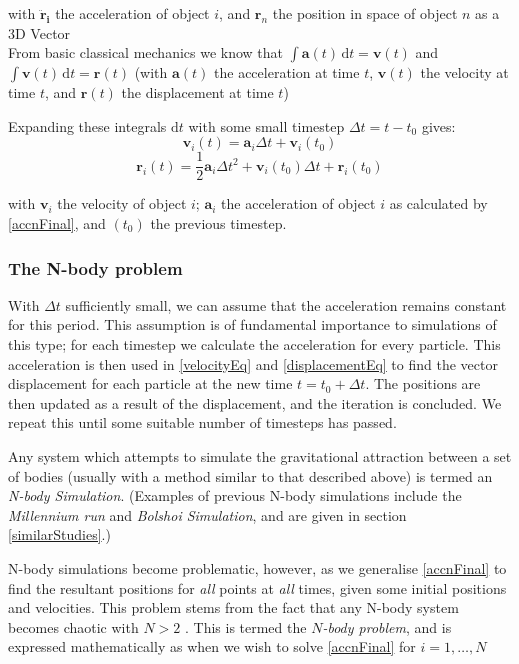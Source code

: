 \documentclass[11pt,a4paper]{article}
\begin{document}
\noindent with $\mathbf {\ddot r_{i}}$ the acceleration of object $i$, and $\mathbf r_{n}$ the position in space of object $n$ as a 3D Vector
\\[0.3cm]
\noindent From basic classical mechanics we know that
$\int \! \mathbf a(t) \, \mathrm{d}t = \mathbf v(t)$ and 
$\int \! \mathbf v(t) \, \mathrm{d}t = \mathbf r(t)$
\noindent (with $\mathbf a(t)$ the acceleration at time $t$, $\mathbf v(t)$ the velocity at time $t$, and $\mathbf r(t)$ the displacement at time $t$)

\noindent Expanding these integrals $\mathrm{d}t$ with some small timestep $\Delta t=t-t_0$ gives:
\begin{equation}
\mathbf v_i(t) = \mathbf a_i \Delta t + \mathbf v_i(t_0)
\label{velocityEq}
\end{equation}
\begin{equation}
\mathbf r_i(t)=\frac{1}{2}\mathbf a_i\Delta t^2 + \mathbf v_i(t_0)\Delta t + \mathbf r_i(t_0)
\label{displacementEq}
\end{equation}

\noindent with $\mathbf v_i$ the velocity of object $i$; $\mathbf a_i$ the acceleration of object $i$ as calculated by \ref{accnFinal}, and $(t_0)$ the previous timestep.


\subsubsection{The N-body problem}
\label{optimisation}
With $\Delta t$ sufficiently small, we can assume that the acceleration remains constant for this period. This assumption is of fundamental importance to simulations of this type; for each timestep we calculate the acceleration for every particle. This acceleration is then used in \ref{velocityEq} and \ref{displacementEq} to find the vector displacement for each particle at the new time $t=t_0+\Delta t$. The positions are then updated as a result of the displacement, and the iteration is concluded. We repeat this until some suitable number of timesteps has passed.

Any system which attempts to simulate the gravitational attraction between a set of bodies (usually with a method similar to that described above) is termed an \emph{N-body Simulation}. (Examples of previous N-body simulations include the \emph{Millennium run} and \emph{Bolshoi Simulation}, and are given in section \ref{similarStudies}.)

N-body simulations become problematic, however, as we generalise \ref{accnFinal} to find the resultant positions for \emph{all} points at \emph{all} times, given some initial positions and velocities. This problem stems from the fact that any N-body system becomes chaotic with $N>2$ \cite{chaoticNbody}. This is termed the \emph{$N$-body problem}, and is expressed mathematically as when we wish to solve \ref{accnFinal} for $i=1, \ldots, N$
\end{document}
